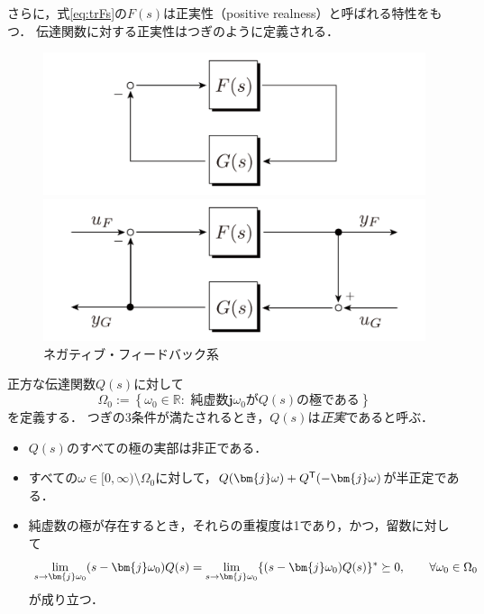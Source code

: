 \documentclass[a4j,10pt,oneside,openany,dvipdfmx]{jsbook}
\begin{document}
さらに，式\eqref{eq:trFs}の$F(s)$は正実性（positive realness）と呼ばれる特性をもつ．
伝達関数に対する正実性はつぎのように定義される．

\begin{figure}[t]
  \centering
  {
  \begin{minipage}{0.40\linewidth}
    \centering
    \includegraphics[width = .99\linewidth]{figs/staFG}
    \subcaption{ }
  \end{minipage}
  \begin{minipage}{0.40\linewidth}
    \centering
    \includegraphics[width = .99\linewidth]{figs/staFGIO}
    \subcaption{ }
  \end{minipage}
  \caption{ネガティブ・フィードバック系}
  \label{fig:staFG}
  }
\end{figure}


\begin{definition}\label{def:trpf}
正方な伝達関数$Q(s)$に対して
\begin{equation}\label{eq:defOm0}
\Omega_0 := \left\{
\omega_0 \in \mathbb{R}: 
\mbox{ 純虚数$\bm{j} \omega_0$が$Q(s)$の極である}
\right\}
\end{equation}
を定義する．
つぎの3条件が満たされるとき，$Q(s)$は\emph{正実}であると呼ぶ．
\begin{itemize}
\item $Q(s)$のすべての極の実部は非正である．
\item すべての$\omega \in [0,\infty)\setminus \Omega_0$に対して，$Q(\bm{j} \omega) + Q^{\sf T}(-\bm{j} \omega)$が半正定である．
\item 純虚数の極が存在するとき，それらの重複度は1であり，かつ，留数に対して
\[
\lim_{s \rightarrow \bm{j} \omega_0} (s-\bm{j} \omega_0) Q(s) = \lim_{s\rightarrow \bm{j} \omega_0} \{ (s-\bm{j} \omega_0) Q(s)\}^{\sf *}\succeq 0
,\qquad
\forall \omega_0 \in \Omega_0
\]
が成り立つ．
\end{itemize}
\end{definition}
\end{document}
